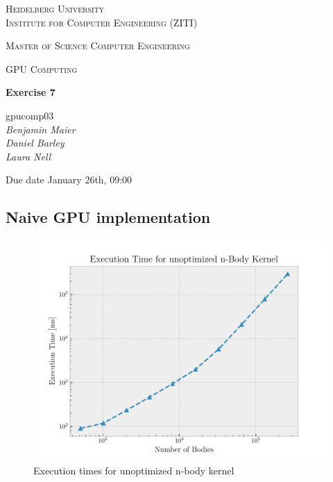 \documentclass[12pt]{article}
\newcommand{\lecture}{GPU Computing}
\newcommand{\exercise}{Exercise 7}
\newcommand{\groupnumber}{gpucomp03}
\newcommand{\groupmemberslist}{Benjamin Maier\\Daniel Barley\\Laura Nell}
\newcommand{\duedate}{January 26th, 09:00}
\begin{document}
	\begin{titlepage}
		\centering

		{\scshape\LARGE Heidelberg University\\Institute for Computer Engineering (ZITI) \par}
		\vspace{1.5cm}
		{\scshape\Large Master of Science Computer Engineering \par}
		\vspace{0.5cm}
		{\scshape\Large \lecture \par}
		\vspace{1.5cm}
		{\huge\bfseries \exercise \par}
		\vspace{2cm}
		{\Large \groupnumber \itshape \\ \vspace{30pt} \groupmemberslist \par}
		\vfill
		
		
		{\large Due date \duedate \par}
	\end{titlepage}

\setcounter{section}{7}

\subsection{Naive GPU implementation}
\begin{figure}[H]
	\centering
	\includegraphics[width=0.9\linewidth]{./plot/time_vs_elems_unopt.pdf}
	\caption{Execution times for unoptimized n-body kernel}%
	\label{fig:time_vs_elems_unopt}
\end{figure}
\end{document}
